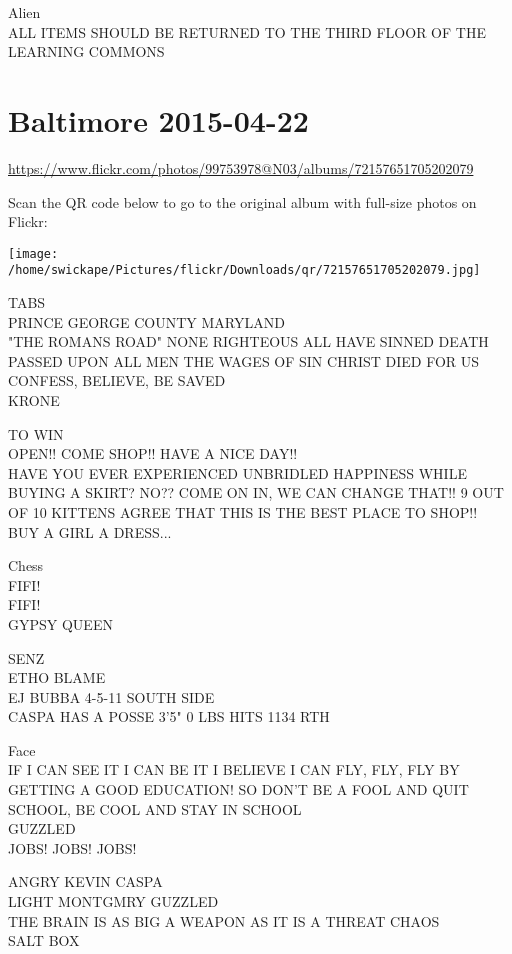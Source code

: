 \documentclass[10pt,letterpaper]{article}
\begin{document}
Alien\\
ALL ITEMS SHOULD BE RETURNED TO THE THIRD FLOOR OF THE LEARNING COMMONS


\section*{Baltimore 2015-04-22}

\url{https://www.flickr.com/photos/99753978@N03/albums/72157651705202079}

Scan the QR code below to go to the original album with full-size photos on Flickr:

\texttt{[image: /home/swickape/Pictures/flickr/Downloads/qr/72157651705202079.jpg]}


TABS\\
PRINCE GEORGE COUNTY MARYLAND\\
"THE ROMANS ROAD" NONE RIGHTEOUS ALL HAVE SINNED DEATH PASSED UPON ALL MEN THE WAGES OF SIN CHRIST DIED FOR US CONFESS, BELIEVE, BE SAVED\\
KRONE

TO WIN\\
OPEN!!  COME SHOP!!  HAVE A NICE DAY!!\\
HAVE YOU EVER EXPERIENCED UNBRIDLED HAPPINESS WHILE BUYING A SKIRT?  NO??  COME ON IN, WE CAN CHANGE THAT!!  9 OUT OF 10 KITTENS AGREE THAT THIS IS THE BEST PLACE TO SHOP!!\\
BUY A GIRL A DRESS...

Chess\\
FIFI!\\
FIFI!\\
GYPSY QUEEN

SENZ\\
ETHO BLAME\\
EJ BUBBA 4{-}5{-}11 SOUTH SIDE\\
CASPA HAS A POSSE 3'5" 0 LBS HITS 1134 RTH

Face\\
IF I CAN SEE IT I CAN BE IT I BELIEVE I CAN FLY, FLY, FLY BY GETTING A GOOD EDUCATION!  SO DON'T BE A FOOL AND QUIT SCHOOL, BE COOL AND STAY IN SCHOOL\\
GUZZLED\\
JOBS!  JOBS!  JOBS!

ANGRY KEVIN CASPA\\
LIGHT MONTGMRY GUZZLED\\
THE BRAIN IS AS BIG A WEAPON AS IT IS A THREAT CHAOS\\
SALT BOX
\end{document}

